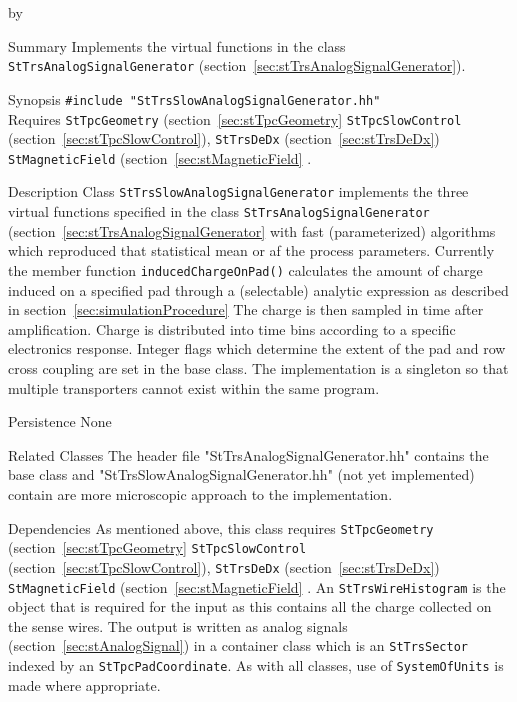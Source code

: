 \documentclass[twoside]{article}
\newcommand{\comp}[1]{\texttt{#1}}%
\newcommand{\entrylabel}[1]{\mbox{\textbf{{#1}}}\hfil}%
\newenvironment{entry}
{\begin{list}{}%
    {\renewcommand{\makelabel}{\entrylabel}%
     \setlength{\labelwidth}{90pt}%
     \setlength{\leftmargin}{\labelwidth}
     \advance\leftmargin by \labelsep%
      }%
    }%
  {\end{list}}
\newcommand{\Entrylabel}[1]%
{\raisebox{0pt}[1ex][0pt]{\makebox[\labelwidth][l]%
    {\parbox[t]{\labelwidth}{\hspace{0pt}\textbf{{#1}}}}}}
\newenvironment{Entry}%
{\renewcommand{\entrylabel}{\Entrylabel}\begin{entry}}%
  {\end{entry}}
\begin{document}
\begin{Entry}
\item[Summary]
  Implements the virtual functions in the class 
  \comp{StTrsAnalogSignalGenerator} 
  (section~\ref{sec:stTrsAnalogSignalGenerator}).

\item[Synopsis]
  \verb+#include "StTrsSlowAnalogSignalGenerator.hh"+\\
  Requires \comp{StTpcGeometry} (section~\ref{sec:stTpcGeometry} 
   \comp{StTpcSlowControl} 
  (section~\ref{sec:stTpcSlowControl}), 
  \comp{StTrsDeDx} (section~\ref{sec:stTrsDeDx}) 
   \comp{StMagneticField} (section~\ref{sec:stMagneticField} 
  .

\item[Description]
Class \comp{StTrsSlowAnalogSignalGenerator} implements the three virtual
functions specified in the class \comp{StTrsAnalogSignalGenerator} 
(section~\ref{sec:stTrsAnalogSignalGenerator} with fast (parameterized)
algorithms which reproduced that statistical mean or af the process
parameters.  Currently the member function \texttt{inducedChargeOnPad()}
calculates the amount of charge induced on a specified pad through
a (selectable) analytic expression as described in 
section~\ref{sec:simulationProcedure}
The charge is then sampled in time after amplification.
Charge is distributed into time bins according to a specific electronics
response.  Integer flags which determine the extent of the pad and
row cross coupling are set in the base class.
The implementation is a singleton  so that
multiple transporters cannot exist within the same program. 

\item[Persistence]
   None

\item[Related Classes]
The header file "StTrsAnalogSignalGenerator.hh" contains the base
class and "StTrsSlowAnalogSignalGenerator.hh" (not yet implemented)
contain are more microscopic approach to the implementation.

\item[Dependencies]
  As mentioned above, this class requires \comp{StTpcGeometry} 
  (section~\ref{sec:stTpcGeometry} 
   \comp{StTpcSlowControl} 
  (section~\ref{sec:stTpcSlowControl}), 
  \comp{StTrsDeDx} (section~\ref{sec:stTrsDeDx}) 
   \comp{StMagneticField} (section~\ref{sec:stMagneticField} 
  .  An \comp{StTrsWireHistogram} is the
  object that is required for the input as this contains all the
  charge collected on the sense wires.  The output is written as analog
  signals (section~\ref{sec:stAnalogSignal}) in a container class which
  is an \comp{StTrsSector} indexed by an \comp{StTpcPadCoordinate}.  As
  with all classes, use of \comp{SystemOfUnits} is made where appropriate.


\end{Entry}
\end{document}
